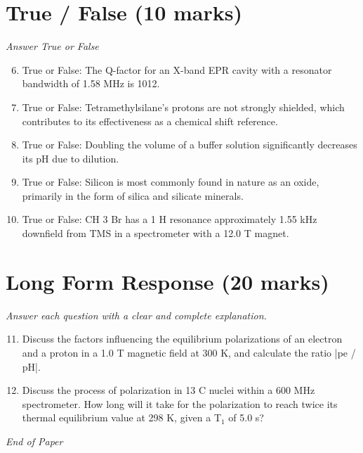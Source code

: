 \documentclass[12pt]{article}
\begin{document}
\section*{True / False (10 marks)}
\textit{Answer True or False}
\begin{enumerate}[label=\arabic*.]
\setcounter{enumi}{5}
\item True or False: The Q-factor for an X-band EPR cavity with a resonator bandwidth of 1.58 MHz is 1012.
\item True or False: Tetramethylsilane's protons are not strongly shielded, which contributes to its effectiveness as a chemical shift reference.
\item True or False: Doubling the volume of a buffer solution significantly decreases its pH due to dilution.
\item True or False: Silicon is most commonly found in nature as an oxide, primarily in the form of silica and silicate minerals.
\item True or False: CH 3 Br has a 1 H resonance approximately 1.55 kHz downfield from TMS in a spectrometer with a 12.0 T magnet.
\end{enumerate}

\section*{Long Form Response (20 marks)}
\textit{Answer each question with a clear and complete explanation.}
\begin{enumerate}[label=\arabic*.]
\setcounter{enumi}{10}
\item Discuss the factors influencing the equilibrium polarizations of an electron and a proton in a 1.0 T magnetic field at 300 K, and calculate the ratio |pe / pH|.
\item Discuss the process of polarization in 13 C nuclei within a 600 MHz spectrometer. How long will it take for the polarization to reach twice its thermal equilibrium value at 298 K, given a T$_{1}$ of 5.0 s?
\end{enumerate}

\vfill
\noindent\textit{End of Paper}
\end{document}
